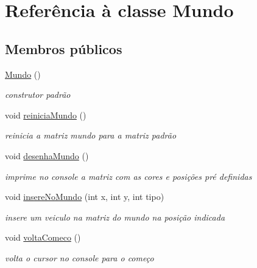 \hypertarget{class_mundo}{}\section{Referência à classe Mundo}
\label{class_mundo}
\subsection*{Membros públicos}
\begin{DoxyCompactItemize}
\item 
\mbox{\hyperlink{class_mundo_ae3801a0a633ad3475456c67639561105}{Mundo}} ()
\begin{DoxyCompactList}\small\item\em construtor padrão \end{DoxyCompactList}\item 
\mbox{\label{class_mundo_a6e10fa6c3ae633a67e2ba897d83ab951}} 
void \mbox{\hyperlink{class_mundo_a6e10fa6c3ae633a67e2ba897d83ab951}{reinicia\+Mundo}} ()
\begin{DoxyCompactList}\small\item\em reinicia a matriz mundo para a matriz padrão \end{DoxyCompactList}\item 
void \mbox{\hyperlink{class_mundo_adbafcb32f5f209eda97e1c7953c6e599}{desenha\+Mundo}} ()
\begin{DoxyCompactList}\small\item\em imprime no console a matriz com as cores e posições pré definidas \end{DoxyCompactList}\item 
\mbox{\label{class_mundo_afec47a52ae6772f201f120fc62ba4546}} 
void \mbox{\hyperlink{class_mundo_afec47a52ae6772f201f120fc62ba4546}{insere\+No\+Mundo}} (int x, int y, int tipo)
\begin{DoxyCompactList}\small\item\em insere um veiculo na matriz do mundo na posição indicada \end{DoxyCompactList}\item 
\mbox{\label{class_mundo_a546c0413297120b08815afafcc0e7d32}} 
void \mbox{\hyperlink{class_mundo_a546c0413297120b08815afafcc0e7d32}{volta\+Comeco}} ()
\begin{DoxyCompactList}\small\item\em volta o cursor no console para o começo \end{DoxyCompactList}\item 

\end{DoxyCompactItemize}
